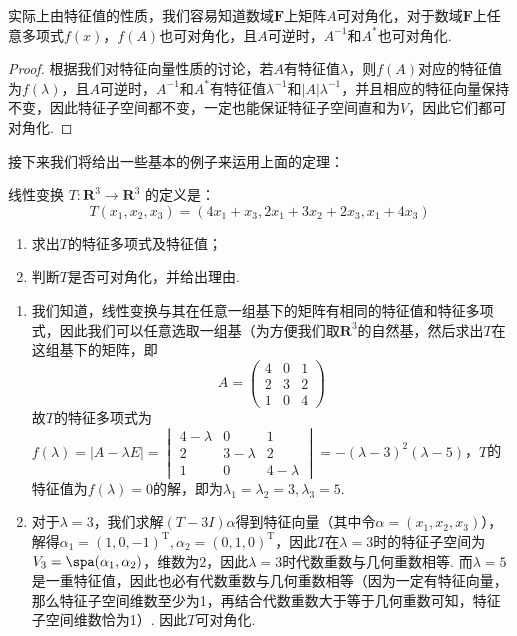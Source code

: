 实际上由特征值的性质，我们容易知道数域$\mathbf{F}$上矩阵$A$可对角化，对于数域$\mathbf{F}$上任意多项式$f(x)$，$f(A)$也可对角化，且$A$可逆时，$A^{-1}$和$A^*$也可对角化.

\begin{proof}
    根据我们对特征向量性质的讨论，若$A$有特征值$\lambda$，则$f(A)$对应的特征值为$f(\lambda)$，且$A$可逆时，$A^{-1}$和$A^*$有特征值$\lambda^{-1}$和$|A|\lambda^{-1}$，并且相应的特征向量保持不变，因此特征子空间都不变，一定也能保证特征子空间直和为$V$，因此它们都可对角化.
\end{proof}

接下来我们将给出一些基本的例子来运用上面的定理：
\begin{example}
    线性变换 $T : \mathbf{R}^3 \to \mathbf{R}^3$ 的定义是：
    \[T(x_1,x_2,x_3)=(4x_1+x_3,2x_1+3x_2+2x_3,x_1+4x_3)\]
    \begin{enumerate}
        \item 求出$T$的特征多项式及特征值；

        \item 判断$T$是否可对角化，并给出理由.
    \end{enumerate}
\end{example}

\begin{solution}
    \begin{enumerate}
        \item 我们知道，线性变换与其在任意一组基下的矩阵有相同的特征值和特征多项式，因此我们可以任意选取一组基（为方便我们取$\mathbf{R}^3$的自然基，然后求出$T$在这组基下的矩阵，即
              \[A=\begin{pmatrix}
                      4 & 0 & 1 \\
                      2 & 3 & 2 \\
                      1 & 0 & 4
                  \end{pmatrix}\]
              故$T$的特征多项式为$f(\lambda)=|A-\lambda E|=\begin{vmatrix}
                      4-\lambda & 0         & 1         \\
                      2         & 3-\lambda & 2         \\
                      1         & 0         & 4-\lambda
                  \end{vmatrix}=-(\lambda-3)^2(\lambda-5)$，$T$的特征值为$f(\lambda)=0$的解，即为$\lambda_1=\lambda_2=3,\lambda_3=5$.

        \item 对于$\lambda=3$，我们求解$(T-3I)\alpha$得到特征向量（其中令$\alpha=(x_1,x_2,x_3)$），解得$\alpha_1=(1,0,-1)^\mathrm{T},\alpha_2=(0,1,0)^\mathrm{T}$，因此$T$在$\lambda=3$时的特征子空间为$V_3=\spa(\alpha_1,\alpha_2)$，维数为$2$，因此$\lambda=3$时代数重数与几何重数相等. 而$\lambda=5$是一重特征值，因此也必有代数重数与几何重数相等（因为一定有特征向量，那么特征子空间维数至少为1，再结合代数重数大于等于几何重数可知，特征子空间维数恰为1）. 因此$T$可对角化.
    \end{enumerate}
\end{solution}

